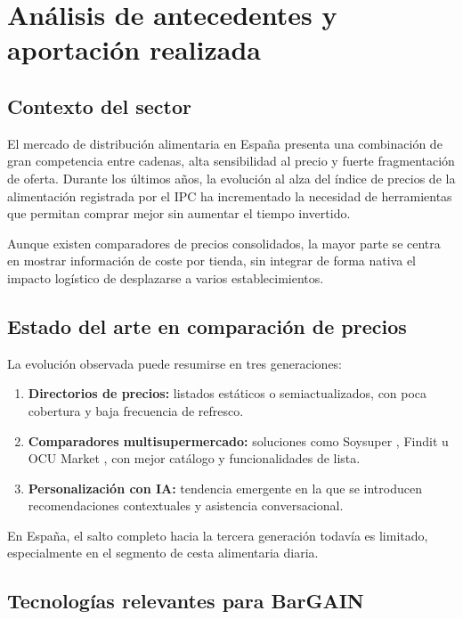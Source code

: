 \chapter{An\'alisis de antecedentes y aportaci\'on realizada}\label{analanteced}

\section{Contexto del sector}

El mercado de distribuci\'on alimentaria en Espa\~na presenta una combinaci\'on de gran
competencia entre cadenas, alta sensibilidad al precio y fuerte fragmentaci\'on de oferta.
Durante los \'ultimos a\~nos, la evoluci\'on al alza del \'indice de precios de la
alimentaci\'on registrada por el IPC \cite{ine_ipc} ha incrementado la necesidad de
herramientas que permitan comprar mejor sin aumentar el tiempo invertido.

Aunque existen comparadores de precios consolidados, la mayor parte se centra en mostrar
informaci\'on de coste por tienda, sin integrar de forma nativa el impacto log\'istico de
desplazarse a varios establecimientos.

\section{Estado del arte en comparaci\'on de precios}

La evoluci\'on observada puede resumirse en tres generaciones:

\begin{enumerate}
	\item \textbf{Directorios de precios:} listados est\'aticos o semiactualizados, con
		poca cobertura y baja frecuencia de refresco.
	\item \textbf{Comparadores multisupermercado:} soluciones como Soysuper
		\cite{soysuper_web}, Findit u OCU Market \cite{ocu_web}, con mejor cat\'alogo y
		funcionalidades de lista.
	\item \textbf{Personalizaci\'on con IA:} tendencia emergente en la que se introducen
		recomendaciones contextuales y asistencia conversacional.
\end{enumerate}

En Espa\~na, el salto completo hacia la tercera generaci\'on todav\'ia es limitado,
especialmente en el segmento de cesta alimentaria diaria.

\section{Tecnolog\'ias relevantes para BarGAIN}

